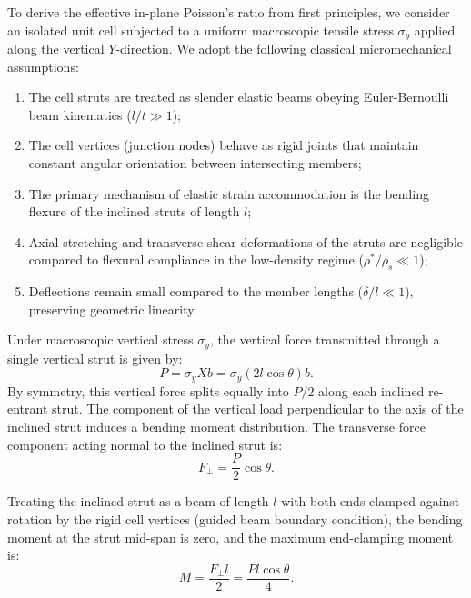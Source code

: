 To derive the effective in-plane Poisson's ratio from first principles, we consider an isolated unit cell subjected to a uniform macroscopic tensile stress $\sigma_y$ applied along the vertical $Y$-direction. We adopt the following classical micromechanical assumptions:
\begin{enumerate}
\item The cell struts are treated as slender elastic beams obeying Euler-Bernoulli beam kinematics ($l/t \gg 1$);
\item The cell vertices (junction nodes) behave as rigid joints that maintain constant angular orientation between intersecting members;
\item The primary mechanism of elastic strain accommodation is the bending flexure of the inclined struts of length $l$;
\item Axial stretching and transverse shear deformations of the struts are negligible compared to flexural compliance in the low-density regime ($\rho^*/\rho_s \ll 1$);
\item Deflections remain small compared to the member lengths ($\delta/l \ll 1$), preserving geometric linearity.
\end{enumerate}

Under macroscopic vertical stress $\sigma_y$, the vertical force transmitted through a single vertical strut is given by:
\begin{equation}
P = \sigma_y X b = \sigma_y \left( 2 l \cos\theta \right) b.
\label{eq:vertical_force}
\end{equation}
By symmetry, this vertical force splits equally into $P/2$ along each inclined re-entrant strut. The component of the vertical load perpendicular to the axis of the inclined strut induces a bending moment distribution. The transverse force component acting normal to the inclined strut is:
\begin{equation}
F_\perp = \frac{P}{2} \cos\theta.
\label{eq:transverse_force}
\end{equation}

Treating the inclined strut as a beam of length $l$ with both ends clamped against rotation by the rigid cell vertices (guided beam boundary condition), the bending moment at the strut mid-span is zero, and the maximum end-clamping moment is:
\begin{equation}
M = \frac{F_\perp l}{2} = \frac{P l \cos\theta}{4}.
\label{eq:bending_moment}
\end{equation}

